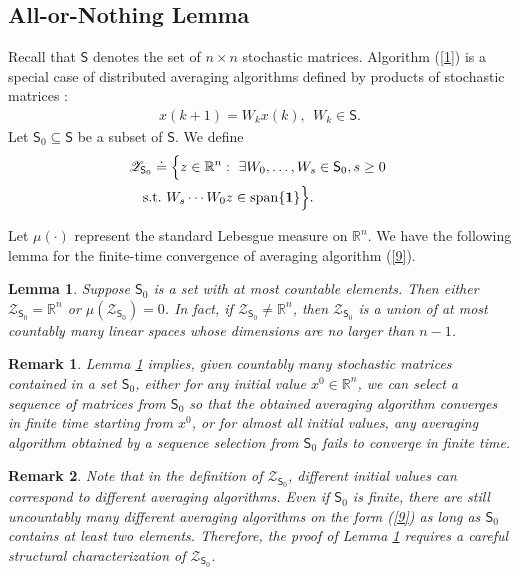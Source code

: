 \documentclass[a4paper, 11pt]{article}
\newtheorem{lemma}{Lemma}
\newtheorem{remark}{Remark}
\begin{document}
\subsection{All-or-Nothing Lemma}

  Recall that  $\mathsf{S}$ denotes the set of $n\times n$ stochastic matrices.  Algorithm (\ref{1}) is  a special case of distributed averaging algorithms defined by products of stochastic matrices \cite{Tsitsiklis1986,Jadbabaie2003}:
\begin{align}\label{9}
 x(k+1)=W_kx(k),\ \ W_k\in \mathsf{S}.
 \end{align}
 Let $\mathsf{S}_0\subseteq \mathsf{S}$ be a subset of $\mathsf{S}$.  We define
\begin{align*}
&\mathscr{Z}_{\mathsf{S}_0}\doteq  \Big\{z\in \mathbb{R}^n: \ \exists W_0,\dots,W_s\in \mathsf{S}_0, s\geq 0\ \nonumber\\
&\ \ \ {\rm s.t.}\  W_s\cdots W_0z\in {\rm span}\{\mathbf{1}\} \Big\}.
\end{align*}


Let ${\mu}(\cdot)$ represent the standard Lebesgue measure on $\mathbb{R}^n$. We have the following lemma for the finite-time convergence of averaging algorithm (\ref{9}).

\medskip

\begin{lemma}\label{all-or-nothing}
Suppose $\mathsf{S}_0$ is a set with at most countable elements.  Then either $\mathscr{Z}_{\mathsf{S}_0}=\mathbb{R}^n$ or  ${\mu}(\mathscr{Z}_{\mathsf{S}_0})=0$. In fact, if $\mathscr{Z}_{\mathsf{S}_0}\neq\mathbb{R}^n$, then $\mathscr{Z}_{\mathsf{S}_0}$ is a union of at most countably many linear spaces whose dimensions are no larger than $n-1$.
\end{lemma}

\medskip

\begin{remark}
Lemma \ref{all-or-nothing} implies, given countably many stochastic matrices contained in a set $\mathsf{S}_0$, either for any initial value $x^0\in\mathbb{R}^n$, we can select a sequence of matrices from $\mathsf{S}_0$ so that the obtained averaging algorithm converges in finite time starting from $x^0$, or for almost all initial values, any averaging algorithm obtained by a sequence selection from $\mathsf{S}_0$ fails to converge in finite time.
\end{remark}

\begin{remark} Note that in the definition of $\mathscr{Z}_{\mathsf{S}_0}$, different initial values can correspond to different averaging algorithms.
Even if $\mathsf{S}_0$ is finite, there are still  uncountably many different averaging algorithms on the form (\ref{9}) as long as $\mathsf{S}_0$ contains at least two elements. Therefore, the proof of Lemma \ref{all-or-nothing} requires a careful structural characterization of $\mathscr{Z}_{\mathsf{S}_0}$.
\end{remark}
\end{document}
